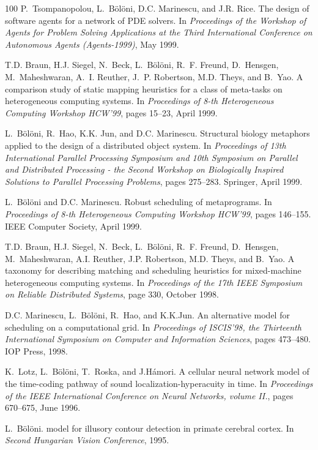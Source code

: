 \begin{thebibliography}{100}
P.~Tsompanopolou, L.~Bölöni, D.C. Marinescu, and J.R. Rice.
\newblock The design of software agents for a network of {PDE} solvers.
\newblock In {\em Proceedings of the Workshop of Agents for Problem Solving
  Applications at the Third International Conference on Autonomous Agents
  ({A}gents-1999)}, May 1999.

T.D. Braun, H.J. Siegel, N.~Beck, L.~Bölöni, R.~F. Freund, D.~Hensgen,
  M.~Maheshwaran, A.~I. Reuther, J.~P. Robertson, M.D. Theys, and B.~Yao.
\newblock A comparison study of static mapping heuristics for a class of
  meta-tasks on heterogeneous computing systems.
\newblock In {\em Proceedings of 8-th Heterogeneous Computing Workshop HCW'99},
  pages 15--23, April 1999.

L.~Bölöni, R.~Hao, K.K. Jun, and D.C. Marinescu.
\newblock Structural biology metaphors applied to the design of a distributed
  object system.
\newblock In {\em Proceedings of 13th International Parallel Processing
  Symposium and 10th Symposium on Parallel and Distributed Processing - the
  Second Workshop on Biologically Inspired Solutions to Parallel Processing
  Problems}, pages 275--283. Springer, April 1999.

L.~Bölöni and D.C. Marinescu.
\newblock Robust scheduling of metaprograms.
\newblock In {\em Proceedings of 8-th Heterogeneous Computing Workshop HCW'99},
  pages 146--155. IEEE Computer Society, April 1999.

T.D. Braun, H.J. Siegel, N.~Beck, L.~Bölöni, R.~F. Freund, D.~Hensgen,
  M.~Maheshwaran, A.I. Reuther, J.P. Robertson, M.D. Theys, and B.~Yao.
\newblock A taxonomy for describing matching and scheduling heuristics for
  mixed-machine heterogeneous computing systems.
\newblock In {\em Proceedings of the 17th IEEE Symposium on Reliable
  Distributed Systems}, page 330, October 1998.

D.C. Marinescu, L.~Bölöni, R.~Hao, and K.K.Jun.
\newblock An alternative model for scheduling on a computational grid.
\newblock In {\em Proceedings of {ISCIS'98}, the Thirteenth International
  Symposium on Computer and Information Sciences}, pages 473--480. IOP Press,
  1998.

K.~Lotz, L.~Bölöni, T.~Roska, and J.H{\'a}mori.
\newblock A cellular neural network model of the time-coding pathway of sound
  localization-hyperacuity in time.
\newblock In {\em Proceedings of the IEEE International Conference on Neural
  Networks, volume II.}, pages 670--675, June 1996.

L.~Bölöni.
 model for illusory contour detection in primate cerebral
  cortex.
\newblock In {\em Second Hungarian Vision Conference}, 1995.

\end{thebibliography}
